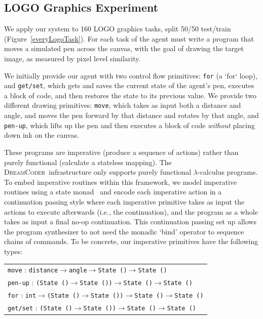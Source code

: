 \documentclass{article}
\newcommand{\system}{\textsc{DreamCoder}~}
\newcommand{\code}[1]{{\footnotesize\texttt{#1}}}
\begin{document}
\subsection{LOGO Graphics Experiment}

We apply our system to 160 LOGO graphics tasks, split 50/50 test/train (Figure~\ref{everyLogoTask}).
For each task of the agent must write a program that moves a simulated pen across the canvas,
with the goal of drawing the target image, as measured by pixel level similarity.

We initially provide our agent with two control flow primitives: \code{for} (a `for` loop), and \code{get/set}, which gets and saves the current state of the agent's pen, executes a block of code, and then restores the state to its previous value. We provide two different drawing primitives: \code{move}, which takes as input both a distance and angle, and moves the pen forward by that distance and rotates by that angle, and \code{pen-up}, which lifts up the pen and then executes a block of code \emph{without} placing down ink on the canvas.

These programs are imperative (produce a sequence of actions) rather than purely functional (calculate a stateless mapping).
The \system infrastructure only supports purely functional $\lambda$-calculus programs.
To embed imperative routines within this framework,
we model imperative routines using a state monad~\cite{wadler1990comprehending} and encode each imperative action in a continuation passing style where each imperative primitive takes as input the actions to execute afterwards (i.e., the continuation),
and the program as a whole takes as input a final no-op continuation.
This continuation passing set up allows the program synthesizer to not need the monadic `bind' operator to sequence chains of commands.
To be concrete, our imperative primitives have the following types:

\begin{tabular}{l}
  \code{move} : \code{distance}$\to$\code{angle}$\to$\code{State ()}$\to$\code{State ()}\\
  \code{pen-up} : \code{(State ()$\to$State ())}$\to$\code{State ()}$\to$\code{State ()}\\
  \code{for} : \code{int$\to$(State ()$\to$State ())}$\to$\code{State ()}$\to$\code{State ()}\\
  \code{get/set} : \code{(State ()$\to$State ())}$\to$\code{State ()}$\to$\code{State ()}
\end{tabular}
\end{document}
